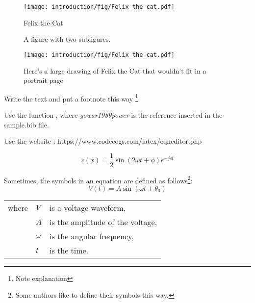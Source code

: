 

\begin{figure}[tb]
\centering
\texttt{[image: introduction/fig/Felix\_the\_cat.pdf]}
\caption{Felix the Cat}
\label{fig:felix}
\end{figure}



\begin{figure}[tb]
	\centering
	\caption{A figure with two subfigures.}
	\label{fig:fig2}
\end{figure}



\begin{landscape}
	\begin{figure}[H]
\centering
\texttt{[image: introduction/fig/Felix\_the\_cat.pdf]}
\caption{Here's a large drawing of Felix the Cat that wouldn't fit in a portrait page}
\label{fig:felix2}
\end{figure}
\end{landscape}



Write the text and put a footnote this way \footnote{Note explanation}


Use the function \cite{gowar1989power}, where \emph{gowar1989power} is the reference inserted in the sample.bib file.


Use the website : https://www.codecogs.com/latex/eqneditor.php

\begin{equation}
v(x)=\frac{1}{2}\sin(2 \omega t + \phi) e^{-j s t}
\label{eq:cacona}
\end{equation}

\begin{samepage}
Sometimes, the symbols in an equation are defined as follows\footnote{Some authors like to define their symbols this way.}:
\begin{equation}
	V(t)=A \sin(\omega t+\theta_0)
\end{equation}
\begin{tabular}{lll}
	where & $V$ & is a voltage waveform,\\
	& $A$ & is the amplitude of the voltage,\\
	& $\omega$ & is the angular frequency,\\
	& $t$ & is the time.
\end{tabular}
\end{samepage}

